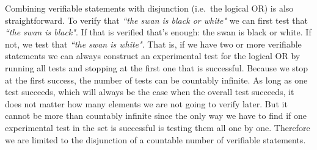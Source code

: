 \documentclass[11pt,letterpaper,fleqn]{memoir} %
\begin{document}
Combining verifiable statements with disjunction (i.e.~the logical OR) is also straightforward. To verify that \emph{``the swan is black or white"} we can first test that \emph{``the swan is black"}. If that is verified that's enough: the swan is black or white. If not, we test that \emph{``the swan is white"}. That is, if we have two or more verifiable statements we can always construct an experimental test for the logical OR by running all tests and stopping at the first one that is successful. Because we stop at the first success, the number of tests can be countably infinite. As long as one test succeeds, which will always be the case when the overall test succeeds, it does not matter how many elements we are not going to verify later. But it cannot be more than countably infinite since the only way we have to find if one experimental test in the set is successful is testing them all one by one. Therefore we are limited to the disjunction of a countable number of verifiable statements.
\end{document}

